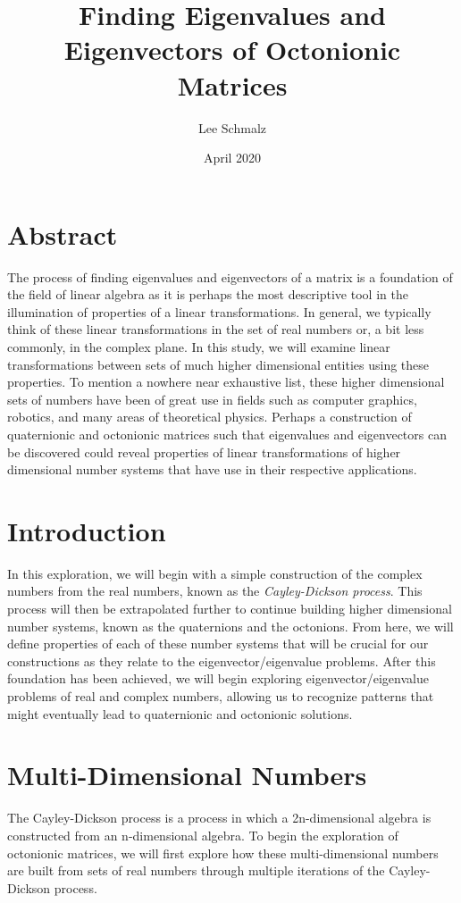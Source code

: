 \documentclass{article}
\title{Finding Eigenvalues and Eigenvectors of Octonionic Matrices}
\author{Lee Schmalz }
\date{April 2020}
\theoremstyle{plain}
\begin{document}
\begin{titlingpage}
\maketitle
\end{titlingpage}

\section{Abstract}
The process of finding eigenvalues and eigenvectors of a matrix is a foundation of the field of linear algebra as it is perhaps the most descriptive tool in the illumination of properties of a linear transformations. In general, we typically think of these linear transformations in the set of real numbers or, a bit less commonly, in the complex plane. In this study, we will examine linear transformations between sets of much higher dimensional entities using these properties. To mention a nowhere near exhaustive list, these higher dimensional sets of numbers have been of great use in fields such as computer graphics, robotics, and many areas of theoretical physics. Perhaps a construction of quaternionic and octonionic matrices such that eigenvalues and eigenvectors can be discovered could reveal properties of linear transformations of higher dimensional number systems that have use in their respective applications.
\section{Introduction}
In this exploration, we will begin with a simple construction of the complex numbers from the real numbers, known as the \emph{Cayley-Dickson process}. This process will then be extrapolated further to continue building higher dimensional number systems, known as the quaternions and the octonions. From here, we will define properties of each of these number systems that will be crucial for our constructions as they relate to the eigenvector/eigenvalue problems. After this foundation has been achieved, we will begin exploring eigenvector/eigenvalue problems of real and complex numbers, allowing us to recognize patterns that might eventually lead to quaternionic and octonionic solutions.
\section{Multi-Dimensional Numbers}
The Cayley-Dickson process is a process in which a 2n-dimensional algebra is constructed from an n-dimensional algebra. To begin the exploration of octonionic matrices, we will first explore how these multi-dimensional numbers are built from sets of real numbers through multiple iterations of the Cayley-Dickson process. 
\end{document}
